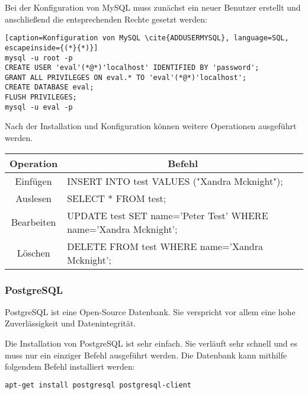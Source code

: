\newpage

Bei der Konfiguration von MySQL muss zunächst ein neuer Benutzer erstellt und anschließend die entsprechenden Rechte gesetzt werden:
\begin{lstlisting}[caption=Konfiguration von MySQL \cite{ADDUSERMYSQL}, language=SQL, escapeinside={(*}{*)}]
mysql -u root -p
CREATE USER 'eval'(*@*)'localhost' IDENTIFIED BY 'password';
GRANT ALL PRIVILEGES ON eval.* TO 'eval'(*@*)'localhost';
CREATE DATABASE eval;
FLUSH PRIVILEGES;
mysql -u eval -p
\end{lstlisting}

Nach der Installation und Konfiguration können weitere Operationen ausgeführt werden.

\begin{table}[htb]
\def\arraystretch{1.3}
\centering
\begin{tabular}{|c|l|}
\hline
\textbf{Operation} & \multicolumn{1}{c|}{\textbf{Befehl}}                            \\ \hline
Einfügen           & INSERT INTO test VALUES ("Xandra Mcknight");                    \\ \hline
Auslesen           & SELECT * FROM test;                                             \\ \hline
Bearbeiten         & UPDATE test SET name='Peter Test' WHERE name='Xandra Mcknight'; \\ \hline
Löschen            & DELETE FROM test WHERE name='Xandra Mcknight';                  \\ \hline
\end{tabular}
\end{table}

\subsubsection{PostgreSQL}
PostgreSQL ist eine Open-Source Datenbank. Sie verspricht vor allem eine hohe Zuverlässigkeit und Datenintegrität.\cite{ABOUTPOSTGRES}

Die Installation von PostgreSQL ist sehr einfach. Sie verläuft sehr schnell und es muss nur ein einziger Befehl ausgeführt werden. Die Datenbank kann mithilfe folgendem Befehl installiert werden:
\begin{lstlisting}[caption=Installation von PostgreSQL \cite{POSTGRES}, language=bash]
apt-get install postgresql postgresql-client
\end{lstlisting}

\newpage

